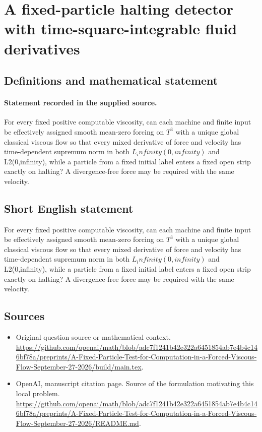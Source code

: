 \documentclass[11pt]{article}
\begin{document}
\section*{A fixed-particle halting detector with time-square-integrable fluid derivatives}\label{statement}
\subsection{Definitions and mathematical statement}
\paragraph{Statement recorded in the supplied source.}
For every fixed positive computable viscosity, can each machine and finite input be effectively assigned smooth mean-zero forcing on $T^3$ with a unique global classical viscous flow so that every mixed derivative of force and velocity has time-dependent supremum norm in both $L_infinity(0,infinity)$ and L2(0,infinity), while a particle from a fixed initial label enters a fixed open strip exactly on halting? A divergence-free force may be required with the same velocity.
\subsection{Short English statement}
For every fixed positive computable viscosity, can each machine and finite input be effectively assigned smooth mean-zero forcing on $T^3$ with a unique global classical viscous flow so that every mixed derivative of force and velocity has time-dependent supremum norm in both $L_infinity(0,infinity)$ and L2(0,infinity), while a particle from a fixed initial label enters a fixed open strip exactly on halting? A divergence-free force may be required with the same velocity.
\subsection{Sources}
\begin{itemize}
\item[S1] Original question source or mathematical context.
\url{https://github.com/openai/math/blob/adc7f1241b42e322a6451854ab7e4b4c146bf78a/preprints/A-Fixed-Particle-Test-for-Computation-in-a-Forced-Viscous-Flow-September-27-2026/build/main.tex}.
\item[S2] OpenAI, manuscript citation page. Source of the formulation motivating this local problem.
\url{https://github.com/openai/math/blob/adc7f1241b42e322a6451854ab7e4b4c146bf78a/preprints/A-Fixed-Particle-Test-for-Computation-in-a-Forced-Viscous-Flow-September-27-2026/README.md}.
\end{itemize}
\end{document}
